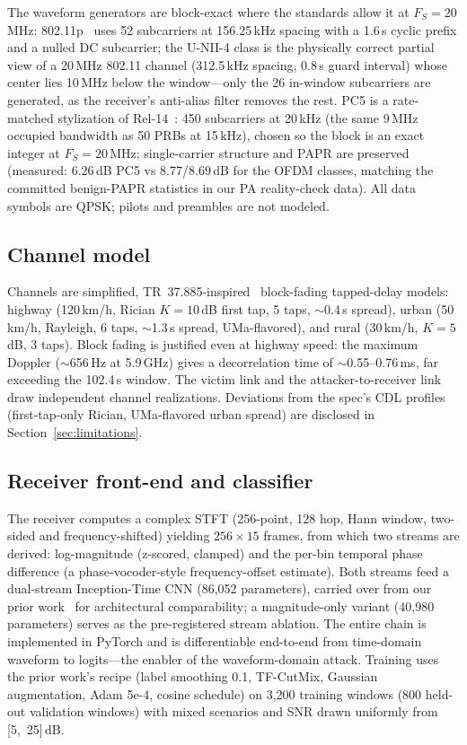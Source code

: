 \documentclass[review]{elsarticle}
\begin{document}
The waveform generators are block-exact where the standards allow it at
$F_S=20$\,MHz: 802.11p~\cite{ieee80211} uses 52 subcarriers at 156.25\,kHz spacing with a
1.6\,\textmu s cyclic prefix and a nulled DC subcarrier; the U-NII-4 class is
the physically correct partial view of a 20\,MHz 802.11 channel (312.5\,kHz
spacing, 0.8\,\textmu s guard interval) whose center lies 10\,MHz below the
window---only the 26 in-window subcarriers are generated, as the receiver's
anti-alias filter removes the rest. PC5 is a rate-matched stylization of
Rel-14~\cite{ts36211}: 450 subcarriers at 20\,kHz (the same 9\,MHz occupied
bandwidth as 50 PRBs at 15\,kHz), chosen so the block is an exact integer at
$F_S=20$\,MHz; single-carrier structure and PAPR are preserved (measured:
6.26\,dB PC5 vs 8.77/8.69\,dB for the OFDM classes, matching the committed
benign-PAPR statistics in our PA reality-check data). All data symbols are
QPSK; pilots and preambles are not modeled.

\subsection{Channel model}
\label{sec:channels}

Channels are simplified, TR~37.885-inspired~\cite{tr37885} block-fading
tapped-delay models: highway (120\,km/h, Rician $K=10$\,dB first tap, 5
taps, ${\sim}$0.4\,\textmu s spread), urban (50\,km/h, Rayleigh, 6 taps,
${\sim}$1.3\,\textmu s spread, UMa-flavored), and rural (30\,km/h, $K=5$\,dB,
3 taps). Block fading is justified even at highway speed: the maximum Doppler
(${\sim}$656\,Hz at 5.9\,GHz) gives a decorrelation time of
${\sim}$0.55--0.76\,ms, far exceeding the 102.4\,\textmu s window. The
victim link and the attacker-to-receiver link draw independent channel
realizations. Deviations from the spec's CDL profiles (first-tap-only
Rician, UMa-flavored urban spread) are disclosed in
Section~\ref{sec:limitations}.

\subsection{Receiver front-end and classifier}
\label{sec:frontend}

The receiver computes a complex STFT (256-point, 128 hop, Hann window,
two-sided and frequency-shifted) yielding $256\times15$ frames, from which
two streams are derived: log-magnitude (z-scored, clamped) and the per-bin
temporal phase difference (a phase-vocoder-style frequency-offset estimate).
Both streams feed a dual-stream Inception-Time CNN (86,052 parameters),
carried over from our prior work~\cite{vats2026legacy} for architectural
comparability; a magnitude-only variant (40,980 parameters) serves as the
pre-registered stream ablation. The entire chain is implemented in PyTorch
and is differentiable end-to-end from time-domain waveform to logits---the
enabler of the waveform-domain attack. Training uses the prior work's recipe
(label smoothing 0.1, TF-CutMix, Gaussian augmentation, Adam 5e-4, cosine
schedule) on 3,200 training windows (800 held-out validation windows) with
mixed scenarios and SNR drawn uniformly from [5,~25]\,dB.
\end{document}
